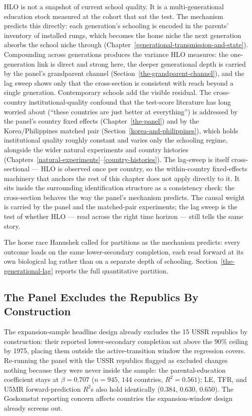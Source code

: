\documentclass[12pt,letterpaper]{article}
\begin{document}
HLO is not a snapshot of current school quality. It is a
multi-generational education stock measured at the cohort that sat
the test. The mechanism predicts this directly: each generation's
schooling is encoded in the parents' inventory of installed rungs,
which becomes the home niche the next generation absorbs the school
niche through
(Chapter~\ref{generational-transmission-and-state}). Compounding across
generations produces the variance HLO measures: the one-generation link is
direct and strong here, the deeper generational depth is carried by the
panel's grandparent channel (Section~\ref{the-grandparent-channel}), and the
lag sweep shows only that the cross-section is consistent with reach beyond a
single generation. Contemporary schools add the visible residual. The cross-country institutional-quality
confound that the test-score literature has long worried about
(``these countries are just better at everything'') is addressed by
the panel's country fixed effects
(Chapter~\ref{the-panel}) and by the Korea/Philippines matched pair
(Section~\ref{korea-and-philippines}), which holds institutional
quality roughly constant and varies only the schooling regime,
alongside the wider natural experiments and country histories
(Chapters~\ref{natural-experiments}--\ref{country-histories}). The lag-sweep is itself cross-sectional --- HLO is
observed once per country, so the within-country fixed-effects
machinery that anchors the rest of this chapter does not apply
directly to it. It sits inside the surrounding identification
structure as a consistency check: the cross-section behaves the way
the panel's mechanism predicts. The causal weight is carried by the
panel and the matched-pair experiments; the lag sweep is the test of
whether HLO --- read across the right time horizon --- still tells
the same story.

The horse race Hanushek called for partitions as the mechanism
predicts: every outcome loads on the same lower-secondary completion,
each read forward at its own biological lag rather than on a separate
depth of schooling.
Section~\ref{the-generational-lag} reports the full
quantitative partition.

\subsection{The Panel Excludes the Republics By Construction}\label{exclusion-robustness}

The expansion-sample headline design already excludes the 15 USSR
republics by construction: their reported lower-secondary completion
sat above the 90\% ceiling by 1975, placing them outside the
active-transition window the regression covers. Re-running the
panel with the USSR republics flagged as excluded changes nothing
because they were never inside the sample: the parental-education
coefficient stays at $\beta=0.707$ ($n=945$, $144$ countries,
$R^2=0.561$); LE, TFR, and U5MR forward-prediction $R^2$s also
hold identically ($0.384$, $0.630$, $0.650$). The Goskomstat
reporting concern affects countries the expansion-window design
already screens out.
\end{document}
